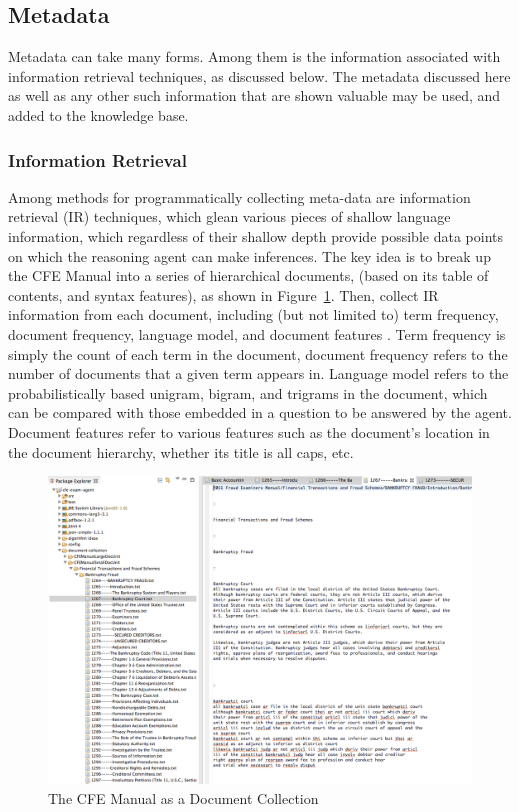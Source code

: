 \subsection{Metadata}

Metadata can take many forms.  Among them is the information associated with information retrieval
techniques, as discussed below.  The metadata discussed here as well as any other such information
that are shown valuable may be used, and added to the knowledge base.

\subsubsection{Information Retrieval}

Among methods for programmatically collecting meta-data are information retrieval (IR) techniques, 
which glean various pieces of shallow language information, which regardless of their shallow depth provide possible data points on which the reasoning agent can make inferences.  The key idea is to break up the CFE Manual into a series of hierarchical documents, (based on its table of contents, and syntax features), as shown in Figure~\ref{fig:document_collection}.  Then, collect IR information from each document, including (but not limited to) term frequency, document frequency, language model, and document features \cite{manning2008introduction}.  Term frequency is simply the count of each term in the document, document frequency refers to the number of documents that a given term appears in.  Language model refers to the probabilistically based unigram, bigram, and trigrams in the document, which can be compared with those embedded in a question to be answered by the agent.  Document features refer to various features such as the document's location in the document hierarchy, whether its title is all caps, etc.

\begin{figure}
\centering
\vspace{2.0in}
\includegraphics[width=150mm]{document_collection.png}
\caption{The CFE Manual as a Document Collection}
\label{fig:document_collection}
\end{figure}

